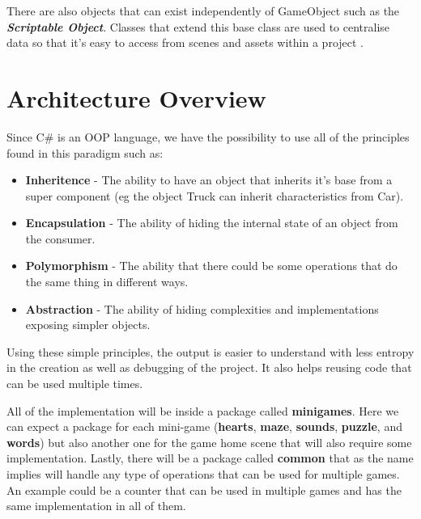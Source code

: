 There are also objects that can exist independently of GameObject such as the \textbf{\textit{Scriptable Object}}. Classes that extend this base class are used to centralise data so that it's easy to access from scenes and assets within a project \cite{unityDocScriptableObj}.



\newpage

\section{Architecture Overview}
Since C\# is an OOP language, we have the possibility to use all of the principles found in this paradigm such as:

\begin{itemize}
    \item \textbf{Inheritence} - The ability to have an object that inherits it's base from a super component (eg the object Truck can inherit characteristics from Car).
    \item \textbf{Encapsulation} - The ability of hiding the internal state of an object from the consumer.
    \item \textbf{Polymorphism} - The ability that there could be some operations that do the same thing in different ways.
    \item \textbf{Abstraction} - The ability of hiding complexities and implementations exposing simpler objects.
\end{itemize}

Using these simple principles, the output is easier to understand with less entropy in the creation as well as debugging of the project. It also helps reusing code that can be used multiple times.

All of the implementation will be inside a package called \textbf{minigames}. Here we can expect a package for each mini-game (\textbf{hearts}, \textbf{maze}, \textbf{sounds}, \textbf{puzzle}, and \textbf{words}) but also another one for the game home scene that will also require some implementation. Lastly, there will be a package called \textbf{common} that as the name implies will handle any type of operations that can be used for multiple games. An example could be a counter that can be used in multiple games and has the same implementation in all of them.


